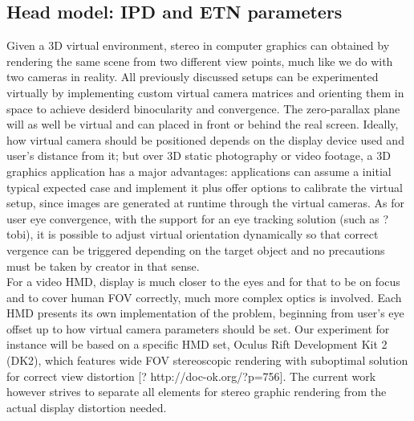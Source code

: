 \subsection{Head model: IPD and ETN parameters}
Given a 3D virtual environment, stereo in computer graphics can obtained by rendering the same scene from two different view points, much like we do with two cameras in reality. All previously discussed setups can be experimented virtually by implementing custom virtual camera matrices and orienting them in space to achieve desiderd binocularity and convergence. The zero-parallax plane will as well be virtual and can placed in front or behind the real screen. Ideally, how virtual camera should be positioned depends on the display device used and user's distance from it; but over 3D static photography or video footage, a 3D graphics application has a major advantages: applications can assume a initial typical expected case and implement it plus offer options to calibrate the virtual setup, since images are generated at runtime through the virtual cameras. As for user eye convergence, with the support for an eye tracking solution (such as ?tobi), it is possible to adjust virtual orientation dynamically so that correct vergence can be triggered depending on the target object and no precautions must be taken by creator in that sense.\\
For a video HMD, display is much closer to the eyes and for that to be on focus and to cover human FOV correctly, much more complex optics is involved. Each HMD presents its own implementation of the problem, beginning from user's eye offset up to how virtual camera parameters should be set. Our experiment for instance will be based on a specific HMD set, Oculus Rift Development Kit 2 (DK2), which features wide FOV stereoscopic rendering with suboptimal solution for correct view distortion [? http://doc-ok.org/?p=756]. The current work however strives to separate all elements for stereo graphic rendering from the actual display distortion needed.\\

